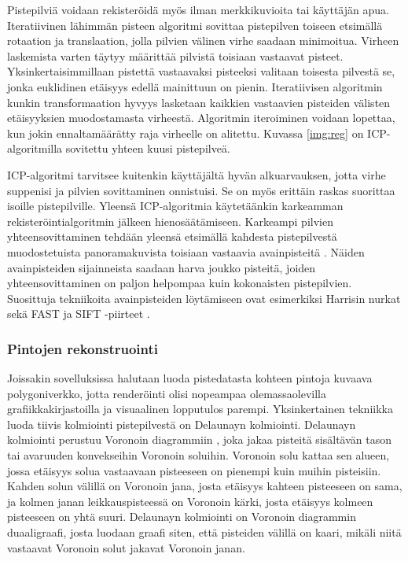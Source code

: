 Pistepilviä voidaan rekisteröidä myös ilman merkkikuvioita tai käyttäjän apua. Iteratiivinen lähimmän pisteen algoritmi  sovittaa pistepilven toiseen etsimällä rotaation ja translaation, jolla pilvien välinen virhe saadaan minimoitua. Virheen laskemista varten täytyy määrittää pilvistä toisiaan vastaavat pisteet. Yksinkertaisimmillaan pistettä vastaavaksi pisteeksi valitaan toisesta pilvestä se, jonka euklidinen etäisyys edellä mainittuun on pienin. Iteratiivisen algoritmin kunkin transformaation hyvyys lasketaan kaikkien vastaavien pisteiden välisten etäisyyksien muodostamasta virheestä. Algoritmin iteroiminen voidaan lopettaa, kun jokin ennaltamäärätty raja virheelle on alitettu. Kuvassa \ref{img:reg} on ICP-algoritmilla sovitettu yhteen kuusi pistepilveä. \cite{icp}


ICP-algoritmi tarvitsee kuitenkin käyttäjältä hyvän alkuarvauksen, jotta virhe suppenisi ja pilvien sovittaminen onnistuisi. Se on myös erittäin raskas suorittaa isoille pistepilville. Yleensä ICP-algoritmia käytetäänkin karkeamman rekisteröintialgoritmin jälkeen hienosäätämiseen. Karkeampi pilvien yhteensovittaminen tehdään yleensä etsimällä kahdesta pistepilvestä muodostetuista panoramakuvista toisiaan vastaavia avainpisteitä . Näiden avainpisteiden sijainneista saadaan harva joukko pisteitä, joiden yhteensovittaminen on paljon helpompaa kuin kokonaisten pistepilvien. Suosittuja tekniikoita avainpisteiden löytämiseen ovat esimerkiksi Harrisin nurkat \cite{harris} sekä FAST ja SIFT -piirteet \cite{fast}\cite{sift}. \cite{weinmann}


\subsubsection{Pintojen rekonstruointi}

Joissakin sovelluksissa halutaan luoda pistedatasta kohteen pintoja kuvaava polygoniverkko, jotta renderöinti olisi nopeampaa olemassaolevilla grafiikkakirjastoilla ja visuaalinen lopputulos parempi. Yksinkertainen tekniikka luoda tiivis kolmiointi pistepilvestä on Delaunayn kolmiointi. Delaunayn kolmiointi perustuu Voronoin diagrammiin , joka jakaa pisteitä sisältävän tason tai avaruuden konvekseihin Voronoin soluihin. Voronoin solu kattaa sen alueen, jossa etäisyys solua vastaavaan pisteeseen on pienempi kuin muihin pisteisiin. Kahden solun välillä on Voronoin jana, josta etäisyys kahteen pisteeseen on sama, ja kolmen janan leikkauspisteessä on Voronoin kärki, josta etäisyys kolmeen pisteeseen on yhtä suuri. Delaunayn kolmiointi on Voronoin diagrammin duaaligraafi, josta luodaan graafi siten, että pisteiden välillä on kaari, mikäli niitä vastaavat Voronoin solut jakavat Voronoin janan. \cite{delaunay}

